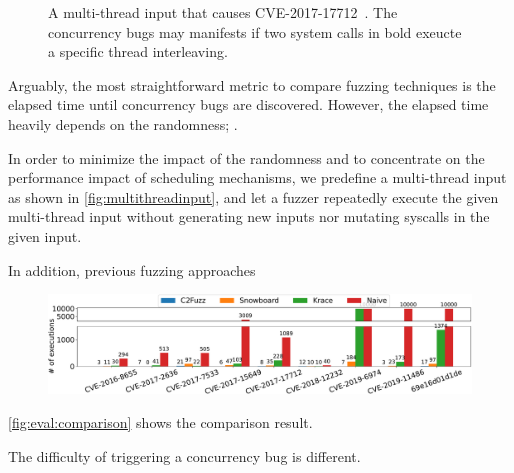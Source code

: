 %
\begin{figure}[t]
  \caption{A multi-thread input that causes
    CVE-2017-17712~\cite{cve201717712}. The concurrency bugs may
    manifests if two system calls in bold exeucte a specific thread
    interleaving.}
  \label{fig:multithreadinput}
\end{figure}
%
Arguably, the most straightforward metric to compare fuzzing
techniques is the elapsed time until concurrency bugs are discovered.
%
However, the elapsed time heavily depends on the randomness;
.

In order to minimize the impact of the randomness and to concentrate
on the performance impact of scheduling mechanisms, we predefine a
multi-thread input as shown in \autoref{fig:multithreadinput}, and let
a fuzzer repeatedly execute the given multi-thread input without
generating new inputs nor mutating syscalls in the given input.

In addition, previous fuzzing approaches


\PP{}
%
\begin{figure}[t]
  \centering
  \includegraphics[width=\linewidth]{fig/comparison_graph-crop.pdf}
  \caption{ }
  \label{fig:eval:comparison}
\end{figure}
%

\autoref{fig:eval:comparison} shows the comparison result.
%



The difficulty of triggering a concurrency bug is different.









